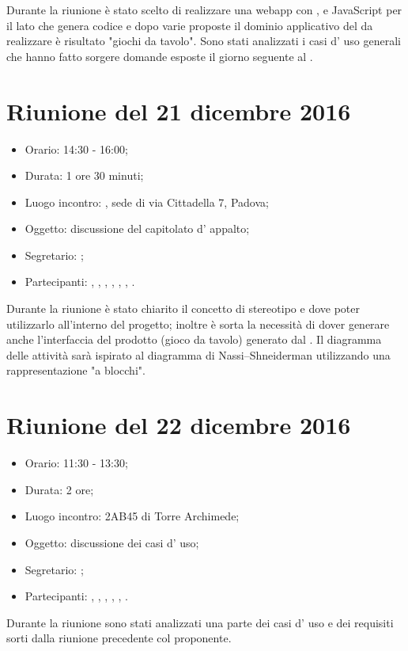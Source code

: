 Durante la riunione è stato scelto di realizzare una webapp con , e JavaScript per il lato  che genera codice  e dopo varie proposte il dominio applicativo del  da realizzare è risultato "giochi da tavolo". 
Sono stati analizzati i casi d' uso generali che hanno fatto sorgere domande esposte il giorno seguente al \GP.



\section{Riunione del 21 dicembre 2016}

\begin{itemize}
	\item Orario: 14:30 - 16:00;
	\item Durata: 1 ore 30 minuti;
	\item Luogo incontro: \ZU, sede di via Cittadella 7, Padova; 
	\item Oggetto: discussione del capitolato d' appalto;
	\item Segretario: \AZ; 
	\item Partecipanti: \GP, \AZ, \GG, \LB, \LS, \MM, \PB.
\end{itemize}

Durante la riunione è stato chiarito il concetto di stereotipo e dove poter utilizzarlo all'interno del progetto; inoltre è sorta la necessità di dover generare anche l'interfaccia del prodotto (gioco da tavolo) generato dal . Il diagramma delle attività sarà ispirato al diagramma di Nassi–Shneiderman utilizzando una rappresentazione "a blocchi".



\section{Riunione del 22 dicembre 2016}

\begin{itemize}
	\item Orario: 11:30 - 13:30;
	\item Durata: 2 ore;
	\item Luogo incontro: 2AB45 di Torre Archimede; 
	\item Oggetto: discussione dei casi d' uso;
	\item Segretario: \PB; 
	\item Partecipanti: \AZ, \GG, \LB, \LS, \MM, \PB.
\end{itemize}

Durante la riunione sono stati analizzati una parte dei casi d' uso e dei requisiti sorti dalla riunione precedente col proponente.

